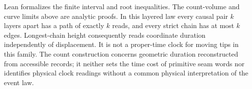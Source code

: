 Lean formalizes the finite interval and root inequalities. The count-volume
and curve limits above are analytic proofs. In this layered law every causal pair $k$
layers apart has a path of exactly $k$ reads, and every strict chain has
at most $k$ edges. Longest-chain height consequently reads coordinate
duration independently of displacement. It is not a proper-time clock
for moving tips in this family. The count construction concerns
geometric duration reconstructed from accessible records; it neither
sets the time cost of primitive seam words nor identifies physical clock
readings without a common physical interpretation of the event law.
